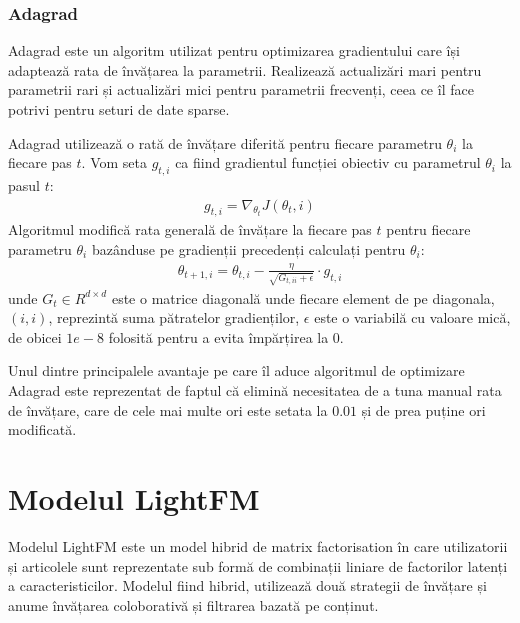 \subsubsection{Adagrad}
Adagrad este un algoritm utilizat pentru optimizarea gradientului care își adaptează rata de învățarea la parametrii. Realizează actualizări mari pentru parametrii rari și actualizări mici pentru parametrii frecvenți, ceea ce îl face potrivi pentru seturi de date sparse.

Adagrad utilizează o rată de învățare diferită pentru fiecare parametru $\theta_i$ la fiecare pas $t$. Vom seta $g_{t,i}$ ca fiind gradientul funcției obiectiv cu parametrul $\theta_i$ la pasul $t$:
\begin{align}
	g_{t,i} = \nabla_{\theta_t}J(\theta_t, i)
\end{align}
Algoritmul modifică rata generală de învățare la fiecare pas $t$ pentru fiecare parametru $\theta_i$ bazânduse pe gradienții precedenți calculați pentru $\theta_i$:
\begin{align}
	\theta_{t+1,i} = \theta_{t,i} - \frac{\eta}{\sqrt{G_{t,ii} + \epsilon}} \cdot g_{t,i}
\end{align}
unde $G_t \in R^{d \times d}$ este o matrice diagonală unde fiecare element de pe diagonala, $(i,i)$, reprezintă suma pătratelor gradienților, $\epsilon$ este o variabilă cu valoare mică, de obicei $1e-8$ folosită pentru a evita împărțirea la 0.

Unul dintre principalele avantaje pe care îl aduce algoritmul de optimizare Adagrad este reprezentat de faptul că elimină necesitatea de a tuna manual rata de învățare, care de cele mai multe ori este setata la $0.01$ și de prea puține ori modificată.

\section{Modelul LightFM}
Modelul LightFM este un model hibrid de matrix factorisation în care utilizatorii și articolele sunt reprezentate sub formă de combinații liniare de factorilor latenți a caracteristicilor. Modelul fiind hibrid, utilizează două strategii de învățare și anume învățarea coloborativă și filtrarea bazată pe conținut.


